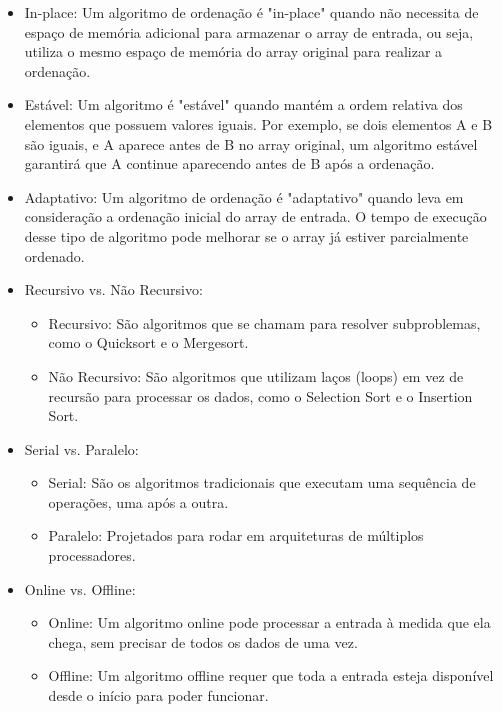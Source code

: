 \begin{itemize}
    \item In-place: Um algoritmo de ordenação é "in-place" quando não necessita de espaço de memória adicional para armazenar o array de entrada, ou seja, utiliza o mesmo espaço de memória do array original para realizar a ordenação.
    \item Estável: Um algoritmo é "estável" quando mantém a ordem relativa dos elementos que possuem valores iguais. Por exemplo, se dois elementos A e B são iguais, e A aparece antes de B no array original, um algoritmo estável garantirá que A continue aparecendo antes de B após a ordenação.
    \item Adaptativo: Um algoritmo de ordenação é "adaptativo" quando leva em consideração a ordenação inicial do array de entrada. O tempo de execução desse tipo de algoritmo pode melhorar se o array já estiver parcialmente ordenado.
    \item Recursivo vs. Não Recursivo:
        \begin{itemize}
            \item Recursivo: São algoritmos que se chamam para resolver subproblemas, como o Quicksort e o Mergesort.
            \item Não Recursivo: São algoritmos que utilizam laços (loops) em vez de recursão para processar os dados, como o Selection Sort e o Insertion Sort.
        \end{itemize}
    \item Serial vs. Paralelo:
        \begin{itemize}
            \item Serial: São os algoritmos tradicionais que executam uma sequência de operações, uma após a outra.
            \item Paralelo: Projetados para rodar em arquiteturas de múltiplos processadores.
        \end{itemize}
    \item Online vs. Offline:
        \begin{itemize}
            \item Online: Um algoritmo online pode processar a entrada à medida que ela chega, sem precisar de todos os dados de uma vez.
            \item Offline: Um algoritmo offline requer que toda a entrada esteja disponível desde o início para poder funcionar.
        \end{itemize}
\end{itemize}

